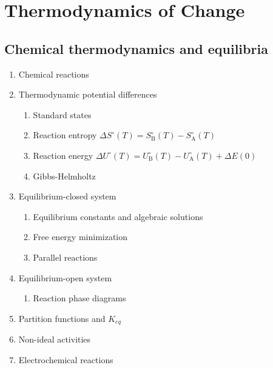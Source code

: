 \documentclass[11pt]{article}
\begin{document}
\section{Thermodynamics of Change}
\label{sec:orgc237df3}
\subsection{Chemical thermodynamics and equilibria}
\label{sec:org61ba7eb}
\begin{enumerate}
\item Chemical reactions
\item Thermodynamic potential differences
\begin{enumerate}
\item Standard states
\item Reaction entropy \(\Delta S^\circ (T) =  S^\circ_\mathrm{B}(T)-S^\circ_\mathrm{A}(T)\)
\item Reaction energy \(\Delta U^\circ (T) = U^\circ_\mathrm{B}(T)-U^\circ_\mathrm{A}(T)+\Delta E(0)\)
\item Gibbs-Helmholtz
\end{enumerate}
\item Equilibrium-closed system
\begin{enumerate}
\item Equilibrium constants and algebraic solutions
\item Free energy minimization
\item Parallel reactions
\end{enumerate}
\item Equilibrium-open system
\begin{enumerate}
\item Reaction phase diagrams
\end{enumerate}
\item Partition functions and \(K_{eq}\)
\item Non-ideal activities
\item Electrochemical reactions
\end{enumerate}
\end{document}
